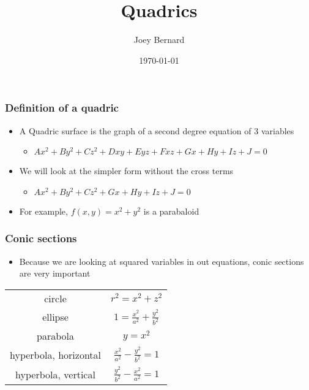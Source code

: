 \documentclass{beamer}
\title{Quadrics}
\author{Joey Bernard}
\institute{University of New Brunswick}
\date{\today}
\begin{document}
\begin{frame}
  \titlepage
\end{frame}

\begin{frame}
  \frametitle{Definition of a quadric}
  \begin{itemize}
  \item A Quadric surface is the graph of a second degree equation of 3 variables
    \begin{itemize}
    \item $Ax^2 + By^2 + Cz^2 + Dxy + Eyz + Fxz + Gx + Hy + Iz + J = 0$
    \end{itemize}
  \item We will look at the simpler form without the cross terms
    \begin{itemize}
    \item $Ax^2 + By^2 + Cz^2 + Gx + Hy + Iz + J = 0$
    \end{itemize}
  \item For example, $f(x,y) = x^2 + y^2$ is a parabaloid
  \end{itemize}
\end{frame}

\begin{frame}
  \frametitle{Conic sections}
  \begin{itemize}
  \item Because we are looking at squared variables in out equations, conic sections are very important
  \end{itemize}
  \begin{center}
    \begin{tabular}{c c}
      circle & $r^2 = x^2 + z^2$ \\
      ellipse & $1 = \frac{x^2}{a^2} + \frac{y^2}{b^2}$ \\
      parabola & $y = x^2$ \\
      hyperbola, horizontal & $\frac{x^2}{a^2} - \frac{y^2}{b^2} = 1$ \\
      hyperbola, vertical & $\frac{y^2}{b^2} - \frac{x^2}{a^2} = 1$
    \end{tabular}
  \end{center}
\end{frame}
\end{document}
